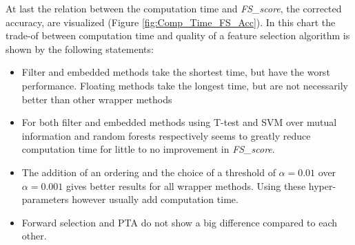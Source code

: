 \documentclass[10pt,a4paper]{report}
\begin{document}
	At last the relation between the computation time and \textit{FS\_score}, the corrected accuracy, are visualized (Figure \ref{fig:Comp_Time_FS_Acc}). In this chart the trade-of between computation time and quality of a feature selection algorithm is  shown by the following statements: 
	\begin{itemize}
		\item Filter and embedded methods take the shortest time, but have the worst performance. Floating methods take the longest time, but are not necessarily better than other wrapper methods
		\item For both filter and embedded methods using T-test and SVM over mutual information and random forests respectively seems to greatly reduce computation time for little to no improvement in \textit{FS\_score}.
		\item The addition of an ordering and the choice of a threshold of $\alpha = 0.01$ over $\alpha = 0.001$ gives better results for all wrapper methods. Using these hyper-parameters however usually add computation time.
		\item Forward selection and PTA do not show a big difference compared to each other.
	\end{itemize}
	
\end{document}
